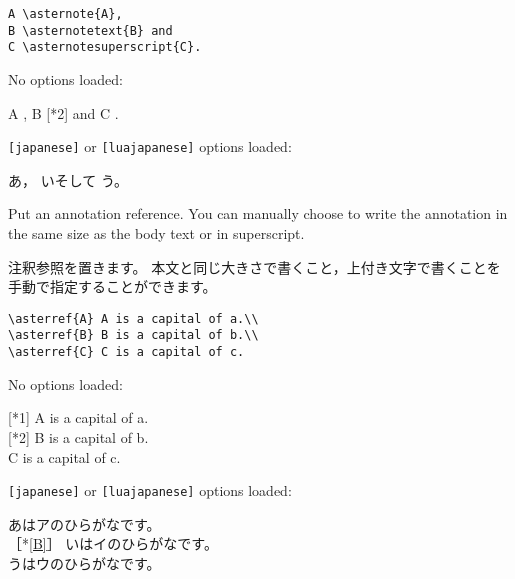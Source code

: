 \documentclass[%
fleqn,%
paper=a4paper,%
fontsize=10pt,%
open_bracket_pos=zenkakunibu_nibu,%
hanging_punctuation,%
]%
{jlreq}
\makeatletter
\DeclareRobustCommand{\linesmash}{\@ifstar{\vspace{-\baselineskip}}{\vspace{-0.25\baselineskip}}}
\newenvironment{translateing}%
{\begin{multicolpar}{2}}
{\end{multicolpar}\vspace{\baselineskip}}
\let\code\texttt
\DeclareRobustCommand{\asterreftext}[1]{{\textsf{［*\ref*{#1}］}}}
\DeclareRobustCommand{\asterrefsuperscript}[1]{\@textsuperscript{\scriptsize\!\!\textsf{［*\ref*{#1}］}}}
\makeatother
\begin{document}
\begin{lstlisting}
A \asternote{A}, 
B \asternotetext{B} and 
C \asternotesuperscript{C}.
\end{lstlisting}

No options loaded:\\
\makeatletter
\begin{macroexample}
A \@textsuperscript{\scriptsize\textsf{[*{1}]}}, 
B {\textsf{[*{2}]}} and 
C \@textsuperscript{\scriptsize\textsf{[*{3}]}}.
\end{macroexample}
\makeatother

\linesmash
\code{[japanese]} or \code{[luajapanese]} options loaded:\\
\begin{macroexample}
あ，
いそして 
う。
\end{macroexample}

\newpage
{}
\quad
\macroexplanation{\asterreftext{<label>}}
\quad
\macroexplanation{\asterrefsuperscript{<label>}}

\begin{translateing}
Put an annotation reference.
You can manually choose to write the annotation in the same size as the body text or in superscript.

注釈参照を置きます。
本文と同じ大きさで書くこと，上付き文字で書くことを手動で指定することができます。
\end{translateing}

\begin{lstlisting}
\asterref{A} A is a capital of a.\\
\asterref{B} B is a capital of b.\\
\asterref{C} C is a capital of c.
\end{lstlisting}

No options loaded:\\
\makeatletter
\begin{macroexample}
{\textsf{[*{1}]}} A is a capital of a.\\
{\textsf{[*{2}]}} B is a capital of b.\\
\@textsuperscript{\scriptsize\textsf{[*{3}]}} C is a capital of c.
\end{macroexample}
\makeatother

\linesmash
\code{[japanese]} or \code{[luajapanese]} options loaded:\\
\begin{macroexample}
 あはアのひらがなです。\\
\asterreftext{B} いはイのひらがなです。\\
\asterrefsuperscript{C} うはウのひらがなです。
\end{macroexample}
\end{document}

